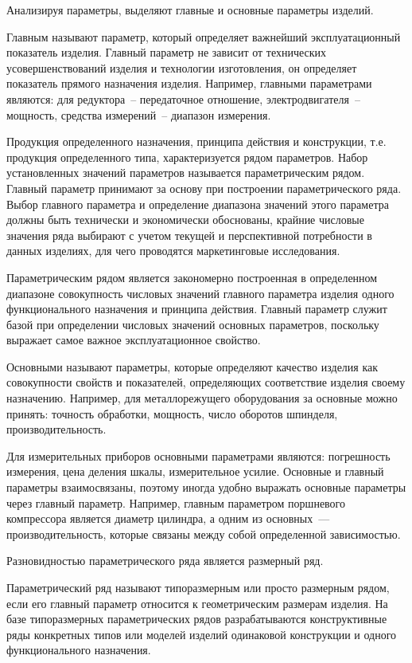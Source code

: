 \begin{enumerate}
Анализируя параметры, выделяют главные и основные параметры изделий.

Главным называют параметр, который определяет важнейший эксплуатационный показатель изделия. Главный параметр не зависит от технических усовершенствований изделия и технологии изготовления, он определяет показатель прямого назначения изделия. Например, главными параметрами являются: для редуктора~-- передаточное отношение, электродвигателя~-- мощность, средства измерений~-- диапазон измерения.

Продукция определенного назначения, принципа действия и конструкции, т.е. продукция определенного типа, характеризуется рядом параметров. Набор установленных значений параметров называется параметрическим рядом. Главный параметр принимают за основу при построении параметрического ряда. Выбор главного параметра и определение диапазона значений этого параметра должны быть технически и экономически обоснованы, крайние числовые значения ряда выбирают с учетом текущей и перспективной потребности в данных изделиях, для чего проводятся маркетинговые исследования.

Параметрическим рядом является закономерно построенная в определенном диапазоне совокупность числовых значений главного параметра изделия одного функционального назначения и принципа действия. Главный параметр служит базой при определении числовых значений основных параметров, поскольку выражает самое важное эксплуатационное свойство. 

Основными называют параметры, которые определяют качество изделия как совокупности свойств и показателей, определяющих соответствие изделия своему назначению. Например, для металлорежущего оборудования за основные можно принять: точность обработки, мощность, число оборотов шпинделя, производительность. 

Для измерительных приборов основными параметрами являются: погрешность измерения, цена деления шкалы, измерительное усилие. 
Основные и главный параметры взаимосвязаны, поэтому иногда удобно выражать основные параметры через главный параметр. Например, главным параметром поршневого компрессора является диаметр цилиндра, а одним из основных~--- производительность, которые связаны между собой определенной зависимостью. 

Разновидностью параметрического ряда является размерный ряд. 

Параметрический ряд называют типоразмерным или просто размерным рядом, если его главный параметр относится к геометрическим размерам изделия. На базе типоразмерных параметрических рядов разрабатываются конструктивные ряды конкретных типов или моделей изделий одинаковой конструкции и одного функционального назначения.


\end{enumerate}
